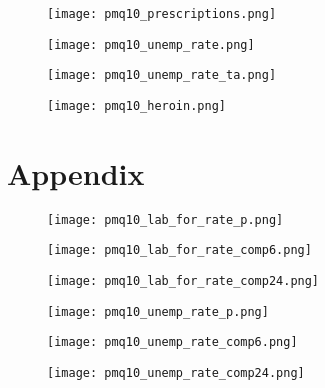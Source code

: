 \documentclass[12pt,a4paper]{article}
\begin{document}
\newpage

\begin{figure}[htbp]
    \centering
    \texttt{[image: pmq10\_prescriptions.png]}
    \caption{}
    \label{fig:prescriptions}
\end{figure}

\newpage

\begin{figure}[htbp]
    \centering
    \texttt{[image: pmq10\_unemp\_rate.png]}
    \caption{}
    \label{fig:unemp_rate}
\end{figure}

\newpage

\begin{figure}[htbp]
    \centering
    \texttt{[image: pmq10\_unemp\_rate\_ta.png]}
    \caption{}
    \label{fig:unemp_rate_ta}
\end{figure}

\newpage

\begin{figure}[htbp]
    \centering
    \texttt{[image: pmq10\_heroin.png]}
    \caption{}
    \label{fig:drugs}
\end{figure}

\newpage

\section*{Appendix}

\begin{figure}[htbp]
    \centering
    \texttt{[image: pmq10\_lab\_for\_rate\_p.png]}
    \caption{}
    \label{fig:lab_for_rate_p}
\end{figure}

\begin{figure}[htbp]
    \centering
    \texttt{[image: pmq10\_lab\_for\_rate\_comp6.png]}
    \caption{}
    \label{fig:lab_for_rate_comp6}
\end{figure}

\begin{figure}[htbp]
    \centering
    \texttt{[image: pmq10\_lab\_for\_rate\_comp24.png]}
    \caption{}
    \label{fig:lab_for_rate_comp24}
\end{figure}

\begin{figure}[htbp]
    \centering
    \texttt{[image: pmq10\_unemp\_rate\_p.png]}
    \caption{}
    \label{fig:unemp_rate_p}
\end{figure}

\begin{figure}[htbp]
    \centering
    \texttt{[image: pmq10\_unemp\_rate\_comp6.png]}
    \caption{}
    \label{fig:unemp_rate_comp6}
\end{figure}

\begin{figure}[htbp]
    \centering
    \texttt{[image: pmq10\_unemp\_rate\_comp24.png]}
    \caption{}
    \label{fig:unemp_rate_comp24}
\end{figure}
\end{document}
